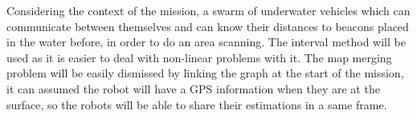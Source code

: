 Considering the context of the mission, a swarm of underwater vehicles which can communicate between themselves and can know their distances to beacons placed in the water before, in order to do an area scanning. The interval method will be used as it is easier to deal with non-linear problems with it. The map merging problem will be easily dismissed by linking the graph at the start of the mission, it can assumed the robot will have a GPS information when they are at the surface, so the robots will be able to share their estimations in a same frame.